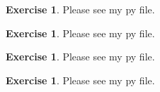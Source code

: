 \documentclass[letterpaper,12pt]{article}
\theoremstyle{definition}
\newtheorem{exercise}[theorem]{Exercise}
\begin{document}
\begin{spacing}{1.5}
    \begin{exercise} \label{Filter_HW_Periodograms} 
Please see my py file.
    \end{exercise}
    
    \begin{exercise} \label{Filter_HW_Periodograms_Filtered} 
Please see my py file.
    \end{exercise}
    
    \begin{exercise} \label{Filter_HW_Moments_HP} 
Please see my py file.
    \end{exercise}
    
    \begin{exercise} \label{Filter_HW_Moments} 
Please see my py file.
    \end{exercise}

\end{spacing}

\newpage


\end{document}
